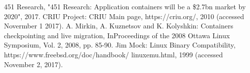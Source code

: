 \documentclass[11pt]{jarticle}
\begin{document}
\begin{thebibliography}{99}
	451 Research, "451 Research: Application containers will be a \$2.7bn market by 2020", 2017.
	CRIU Project: CRIU Main page, https://criu.org/, 2010 (accessed Novermber 1 2017).
	A. Mirkin, A. Kuznetsov and K. Kolyshkin: Containers checkpointing and live migration, InProceedings of the 2008 Ottawa Linux Symposium, Vol. 2, 2008, pp. 85-90.
Jim Mock: Linux Binary Compatibility, https://www.freebsd.org/doc/handbook/
linuxemu.html, 1999 (accessed November 2, 2017).
\end{thebibliography}
\end{document}
